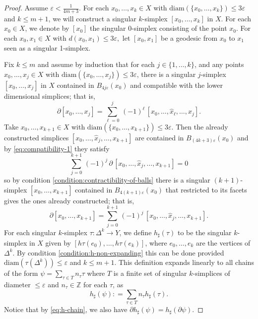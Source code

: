 \documentclass[12pt]{amsart}
\theoremstyle{definition}
\numberwithin{equation}{section}
\newcommand{\diam}{{\text {diam}}}
\begin{document}
\begin{proof}
    Assume $\varepsilon < \frac{1}{4m + 3} $.  For each $x_0, \ldots , x_k \in X$ with $\diam ( \{ x_0, \ldots , x_k  \} ) \leq 3 \varepsilon$ and $k \leq m+1$, we will construct a singular $k$-simplex $[x_0, \ldots , x_k]$ in $X$. For each $x_0 \in X$, we denote by $[x_0]$ the singular $0$-simplex consisting of the point $x_0$. For each $x_0, x_1 \in X$ with  $ d(x_0,x_1) \leq 3 \varepsilon ,$  let  $[x_0, x_1]$ be a geodesic from $x_0$ to $x_1$ seen as a singular 1-simplex. 

    Fix $k \leq m $ and assume by induction that for each $j \in \{ 1, \ldots , k \}$, and any points $x_0, \ldots , x_j \in X$ with $\diam (\{ x_0, \ldots , x_j \}) \leq 3 \varepsilon $, there is a singular $j$-simplex $[x_0, \ldots , x_j] $ in $X$ contained in $B_{4j \varepsilon }(x_0)$ and compatible with the lower dimensional simplices; that is, 
    \begin{equation}\label{eq:compatibility-1}
        \partial [ x_0, \ldots , x_j ] = \sum _{\ell = 0 }^j \,  (-1) ^ {\ell} \, [x_0, \ldots , \hat{x}_{\ell} , \ldots , x_j]    .  
    \end{equation}        
    Take $ x_0 , \ldots , x_{k + 1} \in X $ with $\diam (\{ x_0, \ldots , x_{k+1} \} ) \leq 3 \varepsilon$. Then  the  already constructed simplices $[x_0, \ldots , \hat{x}_j , \ldots , x_{k+1} ]$ are contained in $B_{(4k + 3)\varepsilon}(x_0)$ and by  \eqref{eq:compatibility-1} they satisfy 
    \begin{equation*}
        \sum_{j = 0} ^{k+1} \, (-1) ^{j} \, \partial  \,  [x_0, \ldots , \hat{x}_j , \ldots  , x_{k+1} ] =  0      
    \end{equation*}        
    so by condition  \eqref{condition:contractibility-of-balls} there is a singular $( k + 1 )$-simplex $[x_0, \ldots , x_{k+1}] $ contained in $B_{4(k+1)\varepsilon}(x_0)$ that restricted to its facets gives the ones already constructed; that is, 
    \begin{equation}\label{eq:h-chain}
        \partial [x_0, \ldots , x_{k+1} ] =  \sum_{j=0}^{k+1} \,  (-1)^j \,   [ x_0, \ldots , \hat{x}_j, \ldots , x_{k+1} ]  .     
    \end{equation}            
    For each singular $k$-simplex $\tau : \Delta ^k \to Y $, we define $h_{\sharp} ( \tau ) $ to be the singular $k$-simplex in $X$ given by $[ h \tau (e_0), \ldots , h \tau (e_k)  ]$, where $e_0, \ldots , e_k$ are the vertices of $\Delta ^k$. By condition \eqref{condition:h-non-expanding} this can be done provided $\diam ( \tau (\Delta ^k ) ) \leq \varepsilon $ and $k \leq m+1$. This definition expands linearly to all chains of the form $\psi = \sum_{\tau \in T} n_{\tau} \tau $ where  $T$ is a finite set of singular $k$-simplices of diameter $\leq \varepsilon $ and  $n _{\tau } \in \mathbb{Z}$ for each $\tau$,  as 
    \[ h_{\sharp} (\psi) : = \sum_{\tau \in T} n_{\tau} h_{\sharp }(\tau ). \] 
    Notice that by  \eqref{eq:h-chain}, we also have $ \partial h_{\sharp} (\psi ) = h_{\sharp} (\partial \psi ) $. 



\end{proof}
\end{document}
